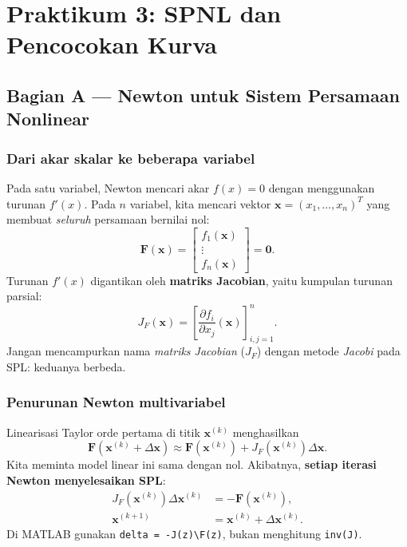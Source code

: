 \chapter{Praktikum 3: SPNL dan Pencocokan Kurva}

\section{Bagian A --- Newton untuk Sistem Persamaan Nonlinear}
\subsection{Dari akar skalar ke beberapa variabel}
Pada satu variabel, Newton mencari akar $f(x)=0$ dengan menggunakan turunan $f'(x)$. Pada $n$ variabel, kita mencari vektor $\mathbf{x}=(x_1,\ldots,x_n)^T$ yang membuat \emph{seluruh} persamaan bernilai nol:
\begin{equation}
\mathbf{F}(\mathbf{x})=\begin{bmatrix}f_1(\mathbf{x})\\ \vdots\\ f_n(\mathbf{x})\end{bmatrix}=\mathbf{0}.
\end{equation}
Turunan $f'(x)$ digantikan oleh \textbf{matriks Jacobian}, yaitu kumpulan turunan parsial:
\begin{equation}
J_F(\mathbf{x})=\left[\frac{\partial f_i}{\partial x_j}(\mathbf{x})\right]_{i,j=1}^{n}.
\end{equation}
Jangan mencampurkan nama \emph{matriks Jacobian} ($J_F$) dengan metode \emph{Jacobi} pada SPL: keduanya berbeda.

\subsection{Penurunan Newton multivariabel}
Linearisasi Taylor orde pertama di titik $\mathbf{x}^{(k)}$ menghasilkan
\begin{equation}
\mathbf{F}(\mathbf{x}^{(k)}+\Delta\mathbf{x})\approx
\mathbf{F}(\mathbf{x}^{(k)})+J_F(\mathbf{x}^{(k)})\Delta\mathbf{x}.
\end{equation}
Kita meminta model linear ini sama dengan nol. Akibatnya, \textbf{setiap iterasi Newton menyelesaikan SPL}:
\begin{align}
J_F(\mathbf{x}^{(k)})\Delta\mathbf{x}^{(k)}&=-\mathbf{F}(\mathbf{x}^{(k)}),\\
\mathbf{x}^{(k+1)}&=\mathbf{x}^{(k)}+\Delta\mathbf{x}^{(k)}.
\end{align}
Di MATLAB gunakan \texttt{delta = -J(z)\textbackslash F(z)}, bukan menghitung \texttt{inv(J)}.


